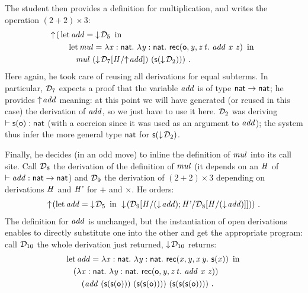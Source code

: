 \documentclass{llncs}
\begin{document}
The student then provides a definition for multiplication, and writes
the operation $(2 + 2)\times3$:
\begin{align*}
  \finfer{}(
  &\letb{add}{\fget{\md_5}}
  \\
  &\quad\letb{mul} { \tlam x {\cst{nat}} \tlam y
    {\cst{nat}} \recb \z {\var y} z t {
      \app{\var{add}}\app{\var x} {\var z}} }
  \\
  &\quad\quad\app{\var{mul}}\app
  {(\fget{\gsubst{\md_7}{\msubst H {\finfer{\var{add}}}}})}
  {(\s{\fget{\md_2}})}
  )
  \ \text{.}
\end{align*}
Here again, he took care of reusing all derivations for equal
subterms. In particular, $\md_7$ expects a proof that the variable
$\var{add}$ is of type $\cst{nat}\to\cst{nat}$; he provides
$\finfer{\var{add}}$ meaning: at this point we will have generated (or
reused in this case) the derivation of $\var{add}$, so we just have to
use it here. $\md_2$ was deriving $\vdash\s\z:\cst{nat}$ (with a
coercion since it was used as an argument to $\var{add}$); the system
thus infer the more general type $\cst{nat}$ for $\s{\fget{\md_2}}$.

Finally, he decides (in an odd move) to inline the definition of
$\var{mul}$ into its call site. Call $\md_8$ the derivation of the
definition of $\var{mul}$ (it depends on an $\var H$ of
$\vdash\var{add}:\cst{nat}\to\cst{nat}$) and $\md_9$ the derivation of
$(2+2)\times 3$ depending on derivations $\var{H}$ and $\var{H'}$ for $+$ and
$\times$. He orders:
\begin{align*}
\finfer{}(
\letb{add}{\fget{\md_5}}
\fget{({\gsubst{\md_9} {\msubst {H} {(\fget{\var{add}})}; \msubst {H'}
      {\gsubst{\md_8}{\msubst H {(\fget{\var{add}})}}}}})}
)
  \ \text{.}
\end{align*}
The definition for $\var{add}$ is unchanged, but the instantiation of
open derivations enables to directly substitute one into the other and
get the appropriate program: call $\md_{10}$ the whole derivation just
returned, $\fget{\md_{10}}$ returns:
\begin{align*}
  &\letb{add}{\tlam x {\cst{nat}} \tlam y {\cst{nat}} \recb {\var x}
    {\var y} x y {\s{\var x}}}
  \\&\quad
  {(\tlam x {\cst{nat}} \tlam y
    {\cst{nat}} \recb \z {\var y} z t {
      \app{\var{add}}\app{\var x} {\var z}})}
  \\&\quad\quad
  \app{(\app {\var{add}} \app {(\s{\s\z})}
    {(\s{\s\z})})}{(\s{\s{\s\z}})}
  \ \text{.}
\end{align*}
\end{document}

